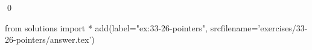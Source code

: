 
\begin{ex}
  \label{ex:33-26-pointers}
  
  \qed
\end{ex}
\begin{python0}
from solutions import *
add(label="ex:33-26-pointers",
    srcfilename='exercises/33-26-pointers/answer.tex')
\end{python0}

